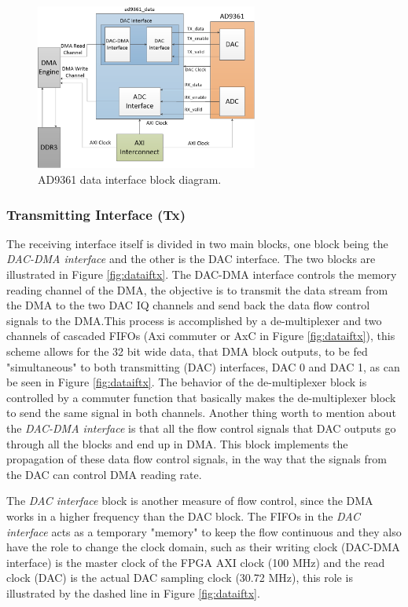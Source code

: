 \begin{figure}[htbp]
    \centering
    \includegraphics[width=0.65\textwidth]{./figures/data_if}
    \caption{ AD9361 data interface block diagram.
    \label{fig:databd}}
\end{figure}

\subsubsection{Transmitting Interface (Tx)}

The receiving interface itself is divided in two main blocks, one block being
the \emph{DAC-DMA interface} and the other is the DAC interface. The two blocks
are illustrated in Figure \ref{fig:dataiftx}. The DAC-DMA interface controls the
memory reading channel of the DMA, the objective is to transmit the data stream
from the DMA to the two DAC IQ channels and send back the data flow control
signals to the DMA.This process is accomplished by a de-multiplexer and two
channels of cascaded FIFOs (Axi commuter or AxC in Figure \ref{fig:dataiftx}),
this scheme allows for the 32 bit wide data, that DMA block outputs, to be fed
"simultaneous" to both transmitting (DAC) interfaces, DAC 0 and DAC 1, as can be
seen in Figure \ref{fig:dataiftx}. The behavior of the de-multiplexer block is
controlled by a commuter function that basically makes the de-multiplexer block
to send the same signal in both channels. Another thing worth to mention about
the \emph{DAC-DMA interface} is that all the flow control signals that DAC
outputs go through all the blocks and end up in DMA. This block implements the
propagation of these data flow control signals, in the way that the signals from
the DAC can control DMA reading rate.

The \emph{DAC interface} block is another measure of flow control, since the DMA
works in a higher frequency than the DAC block. The FIFOs in the \emph{DAC
interface} acts as a temporary "memory" to keep the flow continuous and they
also have the role to change the clock domain, such as their writing clock
(DAC-DMA interface) is the master clock of the FPGA AXI clock (100 MHz) and the
read clock (DAC) is the actual DAC sampling clock (30.72 MHz), this role is
illustrated by the dashed line in Figure \ref{fig:dataiftx}.

